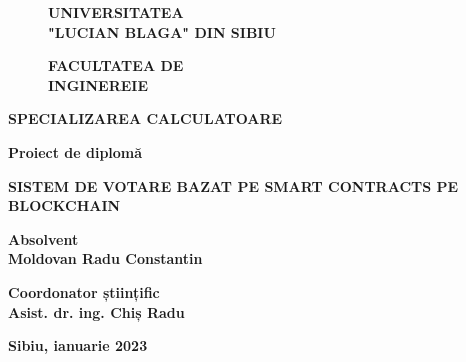 \begin{titlepage}
    \begin{figure}[!htb]
        \centering
        \begin{minipage}{0.5\textwidth}
            \large
            \vspace{0.2cm}
            \begin{center}
                \textbf{UNIVERSITATEA \\
                    "LUCIAN BLAGA" DIN SIBIU}
            \end{center}
            \vspace{0.3cm}
            \begin{center}
                \textbf{
                    FACULTATEA DE \\
                    INGINEREIE
                }
            \end{center}
        \end{minipage}
    \end{figure}

    \begin{center}
        \textbf{SPECIALIZAREA CALCULATOARE}
    \end{center}

    \vspace{1cm}

    \begin{center}
        \Large \textbf{Proiect de diplomă}
    \end{center}

    \begin{center}
        \huge \textbf{\MakeUppercase{Sistem de votare bazat pe Smart Contracts pe Blockchain}}
    \end{center}

    \vspace{3cm}

    \begin{center}
        \large \textbf{Absolvent \\ Moldovan Radu Constantin}
    \end{center}

    \vspace{0.25cm}

    \begin{center}
        \large \textbf{Coordonator științific \\ Asist. dr. ing. Chiș Radu}
    \end{center}

    \vspace{2cm}

    \begin{center}
        \Large \textbf{Sibiu, ianuarie 2023}
    \end{center}
\end{titlepage}
